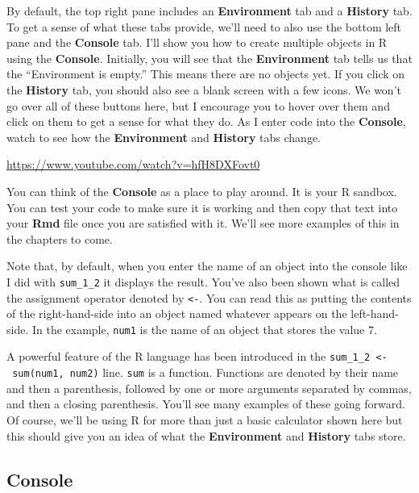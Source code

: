 \documentclass[]{tufte-book}
\begin{document}
By default, the top right pane includes an \textbf{Environment} tab and a \textbf{History} tab. To get a sense of what these tabs provide, we'll need to also use the bottom left pane and the \textbf{Console} tab. I'll show you how to create multiple objects in R using the \textbf{Console}. Initially, you will see that the \textbf{Environment} tab tells us that the ``Environment is empty.'' This means there are no objects yet. If you click on the \textbf{History} tab, you should also see a blank screen with a few icons. We won't go over all of these buttons here, but I encourage you to hover over them and click on them to get a sense for what they do. As I enter code into the \textbf{Console}, watch to see how the \textbf{Environment} and \textbf{History} tabs change.

\vspace{0.1in}\begin{center}\footnotesize{\url{https://www.youtube.com/watch?v=hfH8DXFovt0}}\end{center}\vspace{0.1in}

You can think of the \textbf{Console} as a place to play around. It is your R sandbox. You can test your code to make sure it is working and then copy that text into your \textbf{Rmd} file once you are satisfied with it. We'll see more examples of this in the chapters to come.

Note that, by default, when you enter the name of an object into the console like I did with \texttt{sum\_1\_2} it displays the result. You've also been shown what is called the assignment operator denoted by \texttt{\textless{}-}. You can read this as putting the contents of the right-hand-side into an object named whatever appears on the left-hand-side. In the example, \texttt{num1} is the name of an object that stores the value 7.

A powerful feature of the R language has been introduced in the \texttt{sum\_1\_2\ \textless{}-\ sum(num1,\ num2)} line. \texttt{sum} is a function. Functions are denoted by their name and then a parenthesis, followed by one or more arguments separated by commas, and then a closing parenthesis. You'll see many examples of these going forward. Of course, we'll be using R for more than just a basic calculator shown here but this should give you an idea of what the \textbf{Environment} and \textbf{History} tabs store.

\subsection{Console}\label{console}
\end{document}
